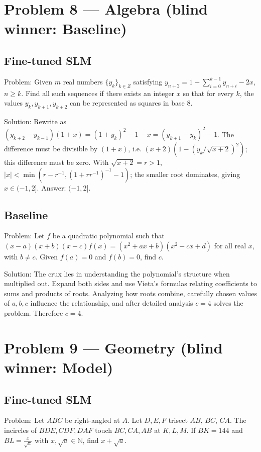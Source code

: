 \documentclass[11pt]{article}
\begin{document}
\section*{Problem 8 --- Algebra \quad(blind winner: Baseline)}

\subsection*{Fine-tuned SLM}

Problem:
Given $m$ real numbers $\{y_{k}\}_{k \in Z}$ satisfying $y_{n+2}=1+\sum_{i=0}^{k-1} y_{n+i}-2 x$, $n \geq k$. Find all such sequences if there exists an integer $x$ so that for every $k$, the values $y_{k}, y_{k+1}, y_{k+2}$ can be represented as squares in base $8$.

Solution:
Rewrite as $(y_{k+2}-y_{k-1})(1+x)=(1+y_k)^2-1-x=(y_{k+1}-y_k)^2-1$. The difference must be divisible by $(1+x)$, i.e. $(x+2)(1-(y_k/\sqrt{x+2})^2)$; this difference must be zero. With $\sqrt{x+2}=r>1$, $|x|<\min(r-r^{-1},(1+rr^{-1})^{-1}-1)$; the smaller root dominates, giving $x \in (-1,2]$. Answer: $(-1, 2]$.

\subsection*{Baseline}

Problem:
Let $f$ be a quadratic polynomial such that $(x - a)(x + b)(x - c) f(x) = (x^2 + ax + b)(x^2 - cx + d)$ for all real $x$, with $b \neq c$. Given $f(a) = 0$ and $f(b) = 0$, find $c$.

Solution:
The crux lies in understanding the polynomial's structure when multiplied out. Expand both sides and use Vieta's formulas relating coefficients to sums and products of roots. Analyzing how roots combine, carefully chosen values of $a,b,c$ influence the relationship, and after detailed analysis $c = 4$ solves the problem. Therefore $c = 4$.

\section*{Problem 9 --- Geometry \quad(blind winner: Model)}

\subsection*{Fine-tuned SLM}

Problem:
Let $ABC$ be right-angled at $A$. Let $D,E,F$ trisect $\overline{AB}$, $\overline{BC}$, $\overline{CA}$. The incircles of $BDE, CDF, DAF$ touch $BC, CA, AB$ at $K,L,M$. If $BK=144$ and $BL=\frac{x}{\sqrt{a}}$ with $x,\sqrt{a}\in\mathbb N$, find $x+\sqrt{a}$.
\end{document}
